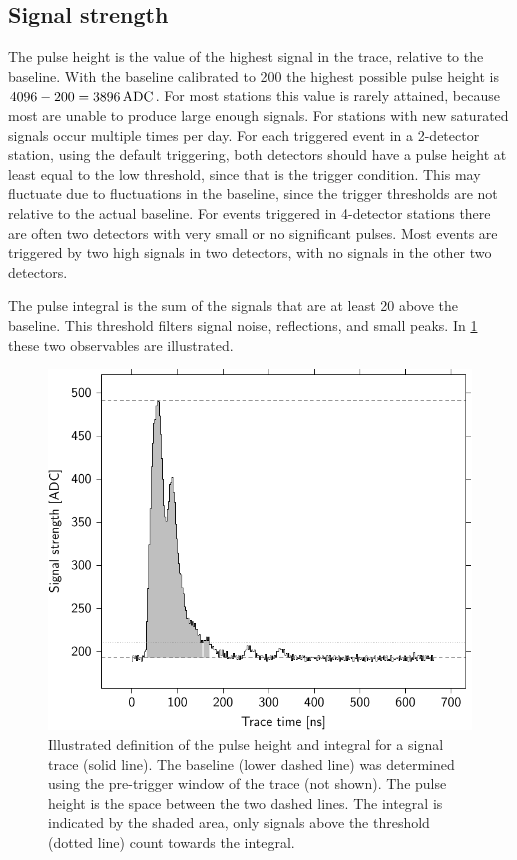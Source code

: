 \subsection{Signal strength}

The pulse height is the value of the highest signal in the trace, relative to the baseline. With the baseline calibrated to \SI{200}{\adc} the highest possible pulse height is $4096 - 200 = \SI{3896}{\adc}$. For most stations this value is rarely attained, because most \pmts are unable to produce large enough signals. For stations with new \pmts saturated signals occur multiple times per day. For each triggered event in a 2-detector station, using the default triggering, both detectors should have a pulse height at least equal to the low threshold, since that is the trigger condition. This may fluctuate due to fluctuations in the baseline, since the trigger thresholds are not relative to the actual baseline. For events triggered in 4-detector stations there are often two detectors with very small or no significant pulses. Most events are triggered by two high signals in two detectors, with no signals in the other two detectors.  

The pulse integral is the sum of the signals that are at least \SI{20}{\adc} above the baseline. This threshold filters signal noise, reflections, and small peaks. In \cref{fig:integral} these two observables are illustrated.

\begin{figure}
    \centering
    \includegraphics[width=0.7\linewidth]{plots/processing/integral}
    \caption{Illustrated definition of the pulse height and integral for a signal trace (solid line). The baseline (lower dashed line) was determined using the pre-trigger window of the trace (not shown). The pulse height is the space between the two dashed lines. The integral is indicated by the shaded area, only signals above the threshold (dotted line) count towards the integral.}
    \label{fig:integral}
\end{figure}


